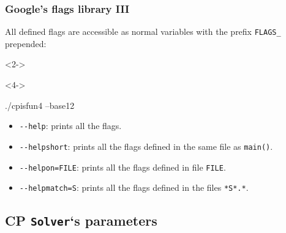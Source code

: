 \documentclass[utf8x,xcolor=dvipsnames]{beamer}
\newcommand{\code}[1]{\texttt{#1}}
\begin{document}
\begin{frame}[fragile]
\frametitle{Google's flags library III}

All defined flags are accessible as normal variables with the prefix \code{FLAGS\_} prepended:
\medskip

\begin{uncoverenv}<2->
\begin{mycode}
    
\end{mycode}
\end{uncoverenv}

\medskip
{}
\medskip

\begin{uncoverenv}<4->
\begin{mycode}
./cp\PYGZus{}is\PYGZus{}fun4 --base12
\end{mycode}
\end{uncoverenv}

\medskip
{}
\medskip

\begin{itemize}
\item<6-> \code{-{-}help}: prints all the flags.
\item<7-> \code{-{-}helpshort}: prints all the flags defined in the same file as \code{main()}.
\item<8-> \code{-{-}helpon=FILE}: prints all the flags defined in file \code{FILE}.
\item<9-> \code{-{-}helpmatch=S}: prints all the flags defined in the files \code{*S*.*}.
\end{itemize}

\end{frame}


\subsection{CP \code{Solver}`s parameters}
\end{document}
